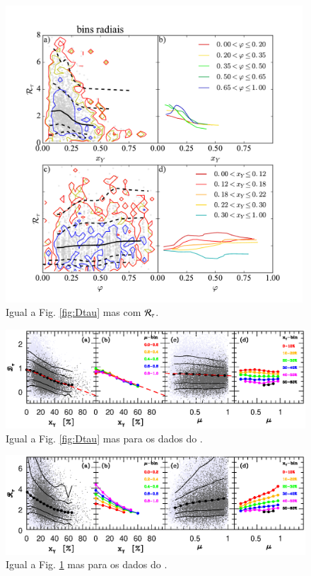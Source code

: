 \begin{figure}
	\centering
	\includegraphics[width=0.99\textwidth]{figuras/RtauR.pdf}
	\caption[$\Rtau$, $x_Y$ e $\varphi$.]
	{Igual a Fig. \ref{fig:Dtau} mas com $\Rtau$.}
	\label{fig:Rtau}
\end{figure}

\begin{figure}
	\centering
	\includegraphics[bb= 30 370 550 550, width=\textwidth]{figuras/P12fig3.eps}
	\caption[$\Dtau$, $x_Y$ e $\varphi$ no \SDSS.]
	{Igual a Fig. \ref{fig:Dtau} mas para os dados do \SDSS.}
	\label{fig:DtauSDSS}
\end{figure}

\begin{figure}
	\centering
	\includegraphics[bb= 30 370 550 550, width=\textwidth]{figuras/P12fig4.eps}
	\caption[$\Rtau$, $x_Y$ e $\varphi$ no \SDSS.]
	{Igual a Fig. \ref{fig:Rtau} mas para os dados do \SDSS.}
	\label{fig:RtauSDSS}
\end{figure}

